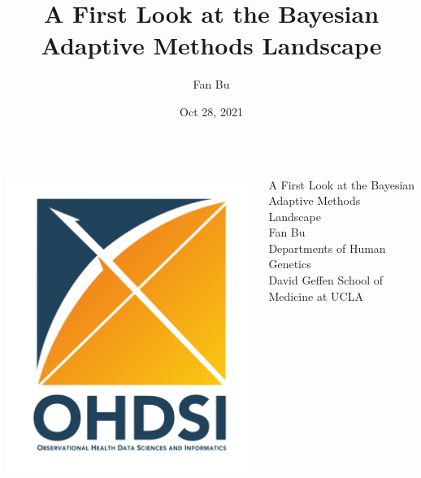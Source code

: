 \documentclass[11pt
,fragile=singleslide
,xcolor=dvipsnames
]{beamer}
\title[
Bayesian Adaptive Methods Review
]
{
A First Look at the Bayesian Adaptive Methods Landscape
}
\subtitle
{} %
\author{Fan Bu}
\institute[UCLA] %
{
	Departments of Human Genetics \\
	David Geffen School of Medicine at UCLA
}
\date{Oct 28, 2021}
\begin{document}
	
	\begin{frame}
		\begin{columns}
			\begin{column}{0.33\textwidth}
				\includegraphics[width=1.0\textwidth]{figures/logo_title_page}
			\end{column}
			\begin{column}{0.66\textwidth}
				\begin{center}
					{\LARGE
						A First Look at the Bayesian Adaptive Methods Landscape } \\[2em]
					
						Fan Bu \\[1em]
						Departments of Human Genetics \\
						David Geffen School of Medicine at UCLA
				\end{center}
			\end{column}
		\end{columns}
		\vspace{1em}
		\vspace{1em}
		
	\end{frame}
	
\end{document}
